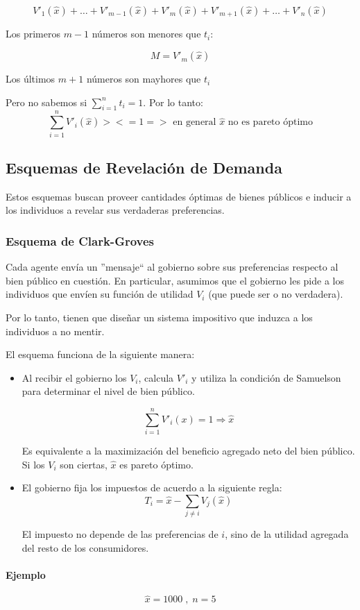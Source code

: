 \begin{enumerate}
\begin{itemize}
$$ V'_1(\hat{x})+\ldots+V'_{m-1}(\hat{x})+V'_m(\hat{x})+V'_{m+1}(\hat{x})+\ldots+V'_n(\hat{x})$$

Los primeros $m-1$ números son menores que $t_i$:

$$M=V'_m(\hat{x})$$

Los últimos $m+1$ números son mayhores que $t_i$

Pero no sabemos si $\sum_{i=1}^{n}t_i=1$. Por lo tanto:
$$ \sum_{i=1}^{n}V'_i(\hat{x}) > < = 1 => \mbox{ en general } \hat{x} \mbox{ no es pareto óptimo}$$
\end{itemize}
\subsection{Esquemas de Revelación de Demanda}

Estos esquemas buscan proveer cantidades óptimas de bienes públicos e inducir a los individuos a revelar sus verdaderas preferencias.

\subsubsection{Esquema de Clark-Groves}
Cada agente envía un ''mensaje`` al gobierno sobre sus preferencias respecto al bien público en cuestión. En particular, asumimos que el gobierno les pide a los individuos que envíen su función de utilidad $V_i$ (que puede ser o no verdadera).

Por lo tanto, tienen que diseñar un sistema impositivo que induzca a los individuos a no mentir.

El esquema funciona de la siguiente manera:
\begin{itemize}
 \item Al recibir el gobierno los $V_i$, calcula $V'_i$ y utiliza la condición de Samuelson para determinar el nivel de bien público.

$$ \sum_{i=1}^{n}V'_i (x)=1  \Longrightarrow \hat{x}$$

Es equivalente a la maximización del beneficio agregado neto del bien público. Si los $V_i$ son ciertas, $\hat{x}$ es pareto óptimo.
 \item El gobierno fija los impuestos de acuerdo a la siguiente regla:
$$T_i=\hat{x}-\sum_{j \neq i} V_j (\hat{x})$$

El impuesto no depende de las preferencias de $i$, sino de la utilidad agregada del resto de los consumidores.
\end{itemize}

\paragraph{Ejemplo}
$$ \hat{x}=1000 \; , \; n=5$$


\end{enumerate}
